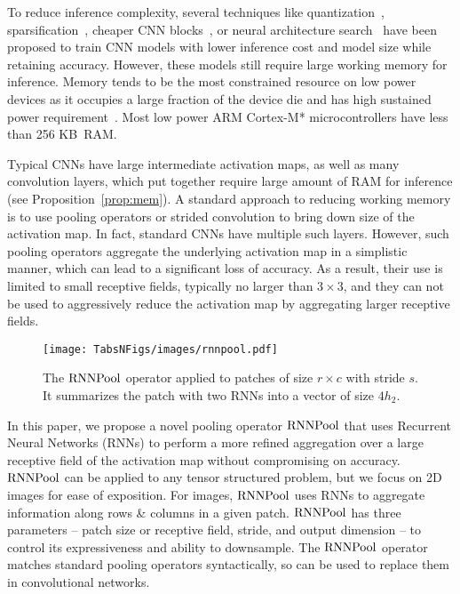 \documentclass[10pt]{article}
\newcommand{\rpool}{\ensuremath{{\rm RNNPool}}\xspace}
\begin{document}
To reduce inference complexity, several techniques like
quantization~\citep{wang2019haq},
sparsification~\citep{gale2019state,kusupati2020soft}, cheaper CNN
blocks~\citep{sandler2018mobilenetv2,iandola2016squeezenet}, or neural
architecture search~\citep{tan2019efficientnet} have been proposed to
train CNN models with lower inference cost and model size while
retaining accuracy. However, these models still require large working
memory for inference. Memory tends to be the most constrained resource
on low power devices as it occupies a large fraction of the device die and
has high sustained power requirement~\citep{kim2017evaluating}. Most
low power ARM Cortex-M* microcontrollers have less than 256 KB~RAM.

Typical CNNs have large intermediate activation maps, as well as many
convolution layers, which put together require large amount of RAM for
inference (see Proposition~\ref{prop:mem}).  A standard approach to
reducing working memory is to use pooling operators or strided
convolution to bring down size of the activation map. In fact,
standard CNNs have multiple such layers. However, such pooling
operators aggregate the underlying activation map in a simplistic
manner, which can lead to a significant loss of accuracy. As a result,
their use is limited to small receptive fields, typically no larger
than $3\times 3$, and they can not be used to aggressively reduce the
activation map by aggregating larger receptive fields.

\begin{wrapfigure}{r}{0.5\columnwidth}
\vspace{-9pt}
 \centering
 \texttt{[image: TabsNFigs/images/rnnpool.pdf]}
 \vspace{-13pt}
 \caption{The \rpool operator applied to patches of size $r \times c$
   with stride $s$. It summarizes the patch with two RNNs into a
   vector of size $4h_2$.}
\label{fig:rnnpoolillus}	
\vspace{-10pt}
\end{wrapfigure}
  In this paper, we propose a
novel pooling operator \rpool that uses Recurrent Neural Networks
(RNNs) to perform a more refined aggregation over a large receptive field of
the activation map without compromising on accuracy. \rpool can be applied
to any tensor structured problem, but we focus on 2D images for ease
of exposition. For images, \rpool uses RNNs to aggregate information
along rows \& columns in a given patch. \rpool has three parameters --
patch size or receptive field, stride, and output dimension -- to
control its expressiveness and ability to downsample. The \rpool
operator matches standard pooling operators syntactically, so can be used to replace
them in convolutional networks.
\end{document}
